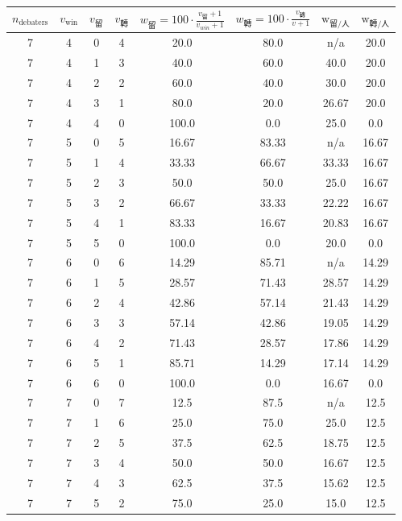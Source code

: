\begin{enumerate}
\begin{table}[h]
    \centering
    \small
    \begin{threeparttable}
    \begin{tabular}{cccccccc}
    \toprule
    $n_{\text{debaters}}$ & $v_{\text{win}}$ & $v_{\text{留}}$ & $v_{\text{轉}}$ & $w_{\text{留}} = 100 \cdot \frac{v_{\text{留}}+1}{v_{win}+1} $ & $w_{\text{轉}} = 100\cdot\frac{v_{\text{轉}}}{v+1}$ & $\text{w}_{\text{留}/\text{人} }$ & $\text{w}_{\text{轉}/\text{人}}$ \\
    \midrule
7 & 4 & 0 & 4 & 20.0 & 80.0 & n/a\tnote{a} & 20.0 \\
7 & 4 & 1 & 3 & 40.0 & 60.0 & 40.0 & 20.0 \\
7 & 4 & 2 & 2 & 60.0 & 40.0 & 30.0 & 20.0 \\
7 & 4 & 3 & 1 & 80.0 & 20.0 & 26.67 & 20.0 \\
7 & 4 & 4 & 0 & 100.0 & 0.0 & 25.0 & 0.0 \\
7 & 5 & 0 & 5 & 16.67 & 83.33 & n/a\tnote{a} & 16.67 \\
7 & 5 & 1 & 4 & 33.33 & 66.67 & 33.33 & 16.67 \\
7 & 5 & 2 & 3 & 50.0 & 50.0 & 25.0 & 16.67 \\
7 & 5 & 3 & 2 & 66.67 & 33.33 & 22.22 & 16.67 \\
7 & 5 & 4 & 1 & 83.33 & 16.67 & 20.83 & 16.67 \\
7 & 5 & 5 & 0 & 100.0 & 0.0 & 20.0 & 0.0 \\
7 & 6 & 0 & 6 & 14.29 & 85.71 & n/a\tnote{a} & 14.29 \\
7 & 6 & 1 & 5 & 28.57 & 71.43 & 28.57 & 14.29 \\
7 & 6 & 2 & 4 & 42.86 & 57.14 & 21.43 & 14.29 \\
7 & 6 & 3 & 3 & 57.14 & 42.86 & 19.05 & 14.29 \\
7 & 6 & 4 & 2 & 71.43 & 28.57 & 17.86 & 14.29 \\
7 & 6 & 5 & 1 & 85.71 & 14.29 & 17.14 & 14.29 \\
7 & 6 & 6 & 0 & 100.0 & 0.0 & 16.67 & 0.0 \\
7 & 7 & 0 & 7 & 12.5 & 87.5 & n/a\tnote{a} & 12.5 \\
7 & 7 & 1 & 6 & 25.0 & 75.0 & 25.0 & 12.5 \\
7 & 7 & 2 & 5 & 37.5 & 62.5 & 18.75 & 12.5 \\
7 & 7 & 3 & 4 & 50.0 & 50.0 & 16.67 & 12.5 \\
7 & 7 & 4 & 3 & 62.5 & 37.5 & 15.62 & 12.5 \\
7 & 7 & 5 & 2 & 75.0 & 25.0 & 15.0 & 12.5 \\

\end{tabular}
\end{threeparttable}
\end{table}
\end{enumerate}
